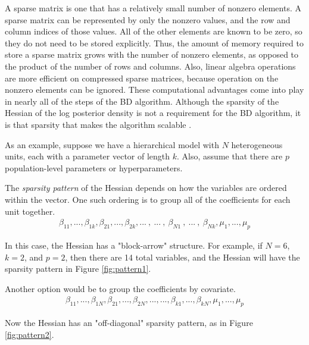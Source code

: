 \documentclass[10pt]{article}\usepackage[]{graphicx}\usepackage[]{color}
\begin{document}
A sparse matrix is one that has a relatively small number of nonzero
elements.  A sparse matrix can be represented by only the nonzero
values, and the row and column indices of those values.  All of the other
elements are known to be zero, so they do not need to be stored
explicitly.  Thus, the amount of memory required to store a sparse
matrix grows with the number of nonzero elements, as opposed to the
product of the number of rows and columns.  Also, linear algebra
operations are more efficient on compressed sparse matrices, because
operation on the nonzero elements can be ignored.  These computational
advantages come into play in nearly all of the steps of the BD
algorithm.  Although the sparsity of the Hessian of the log posterior
density is not a requirement for the BD algorithm, it is that sparsity
that makes the algorithm scalable \citep[Sec. 4]{BraunDamien2015}.



As an example, suppose we have a hierarchical model with $N$ heterogeneous units,
each with a parameter vector of length $k$.  Also, assume that there
are $p$ population-level parameters or hyperparameters.

The \emph{sparsity pattern} of the Hessian depends on how the variables are
ordered within the vector. One such ordering is to group all of the
coefficients for each unit together.
\begin{align}
\beta_{11},...,\beta_{1k},\beta_{21},...,\beta_{2k},...~,~...~,~\beta_{N1}~,~...~,~\beta_{Nk},\mu_1,...,\mu_p
\end{align}

In this case, the Hessian has a "block-arrow" structure.  For example,
if $N=6$, $k=2$, and $p=2$, then there are
14 total variables, and the Hessian will have the sparsity
pattern in Figure \ref{fig:pattern1}.

Another option would be to group the coefficients by covariate.
\begin{align}
\beta_{11},...,\beta_{1N},\beta_{21},...,\beta_{2N},...,...,\beta_{k1},...,\beta_{kN},\mu_1,...,\mu_p
\end{align}

Now the Hessian has an "off-diagonal" sparsity pattern, as in Figure \ref{fig:pattern2}.
\end{document}

